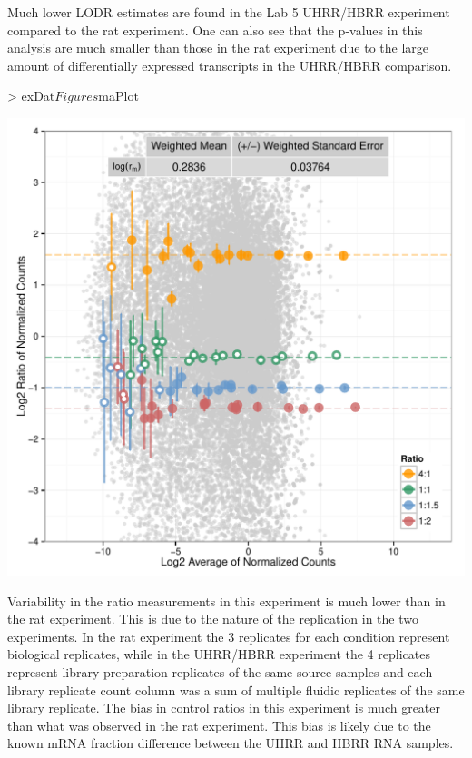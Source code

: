 \documentclass{article}
\begin{document}
Much lower LODR estimates are found in the Lab 5 UHRR/HBRR experiment compared to the 
rat experiment. One can also see that the p-values in this analysis are much smaller
than those in the rat experiment due to the large amount of differentially expressed
transcripts in the UHRR/HBRR comparison.
\clearpage
\begin{center}
\begin{Schunk}
\begin{Sinput}
> exDat$Figures$maPlot
\end{Sinput}
\end{Schunk}
\includegraphics{erccdashboardVignette-seqcCountPlotD}
\end{center}

Variability in the ratio measurements in this experiment is much lower than in
the rat experiment. This is due to the nature of the replication in the two experiments.
In the rat experiment the 3 replicates for each condition represent biological 
replicates, while in the UHRR/HBRR experiment the 4 replicates represent library 
preparation replicates of the same source samples and each library replicate count column was 
a sum of multiple fluidic replicates of the same library replicate.
The bias in control ratios in this experiment is much greater than what was observed in
the rat experiment. This bias is likely due to the known mRNA fraction difference
between the UHRR and HBRR RNA samples.
\end{document}
